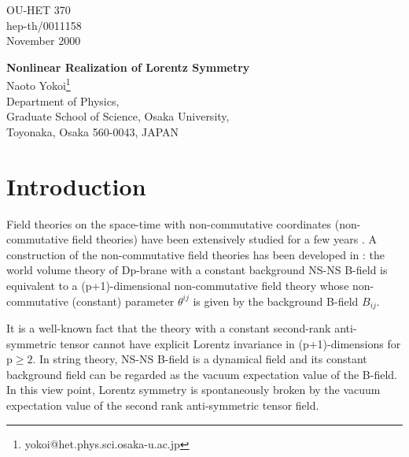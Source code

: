 \documentclass[a4paper,12pt]{article}
\begin{document}
\begin{flushright}
OU-HET 370\\
hep-th/0011158\\
November 2000
\end{flushright}
\vspace*{1.5cm}
\begin{center}
{\Large {\bf Nonlinear Realization of Lorentz Symmetry}} \\
\bigskip
Naoto Yokoi\footnote{yokoi@het.phys.sci.osaka-u.ac.jp}\\
\bigskip
{\small
Department of Physics,\\
Graduate School of Science, Osaka University,\\
Toyonaka, Osaka 560-0043, JAPAN
}
\end{center}
\bigskip
\bigskip
\bigskip

\begin{abstract}
We explore a nonlinear realization of the (2+1)-dimensional 
Lorentz symmetry with a constant vacuum expectation value
of the second rank anti-symmetric tensor field. 
By means of the nonlinear realization, 
we obtain the low-energy effective action of the Nambu-Goldstone
bosons for the spontaneous Lorentz symmetry breaking. 
\end{abstract}

\newpage

\section{Introduction}
Field theories on the space-time with non-commutative coordinates
(non-commutative field theories) have been extensively studied 
for a few years \cite{Connes, IKKT, Seiberg-Witten}. 
A construction of the non-commutative field theories  
has been developed in \cite{Seiberg-Witten}: 
the world volume theory of Dp-brane with
a constant background NS-NS B-field is equivalent to a (p+1)-dimensional
non-commutative field theory whose non-commutative (constant) parameter
$\theta^{ij}$ is given by the background B-field $B_{ij}$.

It is a well-known fact that the theory with a constant second-rank
anti-symmetric tensor cannot have explicit Lorentz invariance
in (p+1)-dimensions for $\textrm{p} \geq 2$.
In string theory, NS-NS B-field is a dynamical 
field and its constant background field
can be regarded as the vacuum expectation value of the B-field.
In this view point, Lorentz symmetry is spontaneously broken
by the vacuum expectation value of the second rank anti-symmetric
tensor field.
\end{document}
